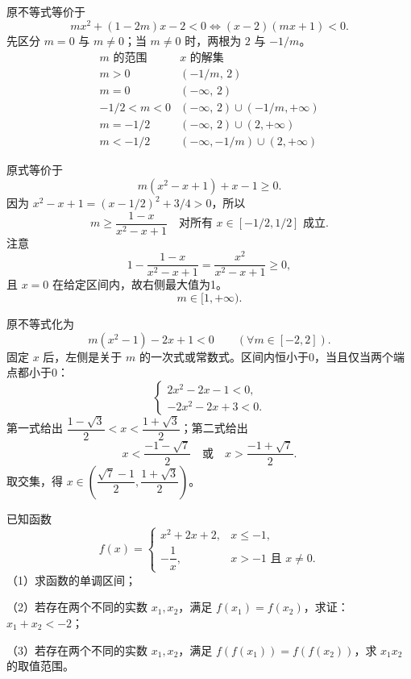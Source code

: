 \begin{frame}
原不等式等价于
\[mx^2+(1-2m)x-2<0\iff(x-2)(mx+1)<0.\]
先区分 $m=0$ 与 $m\ne0$；当 $m\ne0$ 时，两根为 $2$ 与 $-1/m$。
\pause
\[
\boxed{
\begin{array}{c|l}
 m\text{ 的范围}&x\text{ 的解集}\\\hline
 m>0&(-1/m,\,2)\\[1mm]
 m=0&(-\infty,\,2)\\[1mm]
 -1/2<m<0&(-\infty,\,2)\cup(-1/m,+\infty)\\[1mm]
 m=-1/2&(-\infty,\,2)\cup(2,+\infty)\\[1mm]
 m<-1/2&(-\infty,-1/m)\cup(2,+\infty)
\end{array}}
\]
\end{frame}

\begin{frame}
原式等价于
\[m(x^2-x+1)+x-1\ge0.\]
因为 $x^2-x+1=(x-1/2)^2+3/4>0$，所以
\[m\ge\frac{1-x}{x^2-x+1}\quad\text{对所有 }x\in[-1/2,1/2]\text{ 成立}.\]
\pause
注意
\[1-\frac{1-x}{x^2-x+1}=\frac{x^2}{x^2-x+1}\ge0,\]
且 $x=0$ 在给定区间内，故右侧最大值为1。
\[\boxed{m\in[1,+\infty).}\]
\end{frame}

\begin{frame}
原不等式化为
\[m(x^2-1)-2x+1<0\qquad(\forall m\in[-2,2]).\]
固定 $x$ 后，左侧是关于 $m$ 的一次式或常数式。区间内恒小于0，当且仅当两个端点都小于0：
\[\begin{cases}
2x^2-2x-1<0,\\
-2x^2-2x+3<0.
\end{cases}\]
\pause
第一式给出 $\dfrac{1-\sqrt3}{2}<x<\dfrac{1+\sqrt3}{2}$；第二式给出
\[x<\frac{-1-\sqrt7}{2}\quad\text{或}\quad x>\frac{-1+\sqrt7}{2}.\]
取交集，得 $\boxed{x\in\left(\dfrac{\sqrt7-1}{2},\dfrac{1+\sqrt3}{2}\right)}$。
\end{frame}

\begin{frame}
已知函数
\[f(x)=\begin{cases}x^2+2x+2,&x\le-1,\\[1mm]-\dfrac1x,&x>-1\text{ 且 }x\ne0.\end{cases}\]
（1）求函数的单调区间；\par\vspace{2mm}
（2）若存在两个不同的实数 $x_1,x_2$，满足 $f(x_1)=f(x_2)$，求证：$x_1+x_2<-2$；\par\vspace{2mm}
（3）若存在两个不同的实数 $x_1,x_2$，满足 $f(f(x_1))=f(f(x_2))$，求 $x_1x_2$ 的取值范围。
\end{frame}

